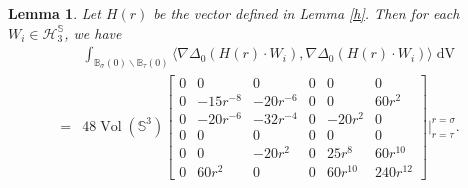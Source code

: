 \documentclass[11pt,letterpaper]{amsart}
\DeclareMathOperator{\Vol}{Vol}
\DeclareMathOperator{\dvol}{dV}
\newcommand{\bB}{\mathbb{B}}
\newcommand{\bS}{\mathbb{S}}
\newtheorem{lemma}[theorem]{Lemma}
\theoremstyle{definition}
\theoremstyle{remark}
\numberwithin{equation}{section}
\begin{document}
\begin{lemma}\label{energy-h}
    Let $H(r)$ be the vector defined in Lemma \ref{h}. Then for each $W_i\in \mathcal{H}^{\bS}_{3}$, we have
\begin{equation}
\begin{split}
    &\int_{\bB_{\sigma}(0)\backslash \bB_{\tau}(0)}\langle \nabla \Delta_0 (H(r)\cdot W_i), \nabla \Delta_0(H(r)\cdot W_i)\rangle \dvol\\
    =&48 \Vol(\bS^3) \begin{bmatrix}
0 & 0 & 0 & 0 & 0& 0\\
0 & -15r^{-8} & -20r^{-6} & 0 & 0& 60r^2\\
0 & -20r^{-6} & {-32r^{-4}}& 0& -20r^2 & 0\\
0 & 0 & 0 & 0 & 0& 0\\
0 & 0 & -20r^2 & 0 & 25r^8& 60r^{10}\\
0 & 60r^2 & 0 & 0 & 60r^{10}& 240r^{12}
\end{bmatrix}\Big|_{r=\tau}^{r=\sigma}.
\end{split}
\end{equation}
\end{lemma}
\end{document}
